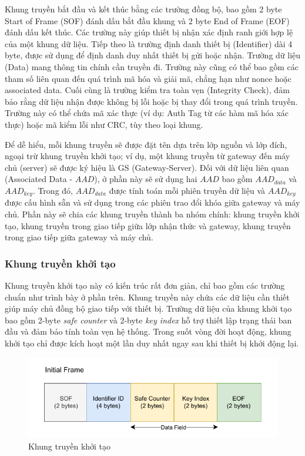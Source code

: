Khung truyền bắt đầu và kết thúc bằng các trường đồng bộ, bao gồm 2 byte Start of Frame (SOF) đánh dấu bắt đầu khung và 2 byte End of Frame (EOF) đánh dấu kết thúc. Các trường này giúp thiết bị nhận xác định ranh giới hợp lệ của một khung dữ liệu.
Tiếp theo là trường định danh thiết bị (Identifier) dài 4 byte, được sử dụng để định danh duy nhất thiết bị gửi hoặc nhận.
Trường dữ liệu (Data) mang thông tin chính cần truyền đi. Trường này cũng có thể bao gồm các tham số liên quan đến quá trình mã hóa và giải mã, chẳng hạn như nonce hoặc associated data.
Cuối cùng là trường kiểm tra toàn vẹn (Integrity Check), đảm bảo rằng dữ liệu nhận được không bị lỗi hoặc bị thay đổi trong quá trình truyền. Trường này có thể chứa mã xác thực (ví dụ: Auth Tag từ các hàm mã hóa xác thực) hoặc mã kiểm lỗi như CRC, tùy theo loại khung.

Để dễ hiểu, mỗi khung truyền sẽ được đặt tên dựa trên lớp nguồn và lớp đích, ngoại trừ khung truyền khởi tạo; ví dụ, một khung truyền từ gateway đến máy chủ (server) sẽ được ký hiệu là GS (Gateway-Server). Đối với dữ liệu liên quan (Associated Data - $AAD$), ở phần này sẽ sử dụng hai $AAD$ bao gồm $AAD_{data}$ và $AAD_{key}$. Trong đó, $AAD_{data}$ được tính toán mỗi phiên truyền dữ liệu và $AAD_{key}$ được cấu hình sẵn và sử dụng trong các phiên trao đổi khóa giữa gateway và máy chủ. Phần này sẽ chia các khung truyền thành ba nhóm chính: khung truyền khởi tạo, khung truyền trong giao tiếp giữa lớp nhận thức và gateway, khung truyền trong giao tiếp giữa gateway và máy chủ.
\subsubsection{Khung truyền khởi tạo}
Khung truyền khởi tạo này có kiến trúc rất đơn giản, chỉ bao gồm các trường chuẩn như trình bày ở phần trên. Khung truyền này chứa các dữ liệu cần thiết giúp máy chủ đồng bộ giao tiếp với thiết bị. Trường dữ liệu của khung khởi tạo bao gồm 2-byte \textit{safe counter} và 2-byte \textit{key index} hỗ trợ thiết lập trạng thái ban đầu và đảm bảo tính toàn vẹn hệ thống. Trong suốt vòng đời hoạt động, khung khởi tạo chỉ được kích hoạt một lần duy nhất ngay sau khi thiết bị khởi động lại.
\begin{figure}[H]
    \centering
    \includegraphics[width=0.6\linewidth]{init-frame.pdf}
    \caption{Khung truyền khởi tạo}
    \label{fig:init-frame}
\end{figure}
